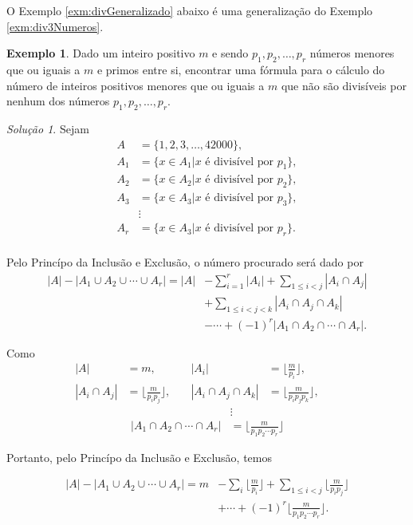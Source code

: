 \documentclass[]{book}
\theoremstyle{definition}
\theoremstyle{definition}
\newtheorem{example}{Exemplo}[chapter]
\theoremstyle{definition}
\theoremstyle{remark}
\newtheorem*{solution}{Solução}
\begin{document}
O Exemplo \ref{exm:divGeneralizado} abaixo é uma generalização do Exemplo \ref{exm:div3Numeros}.

\begin{example}
\protect\hypertarget{exm:divGeneralizado}{}{\label{exm:divGeneralizado} }Dado um inteiro positivo \(m\) e sendo \(p_1, p_2, \ldots, p_r\) números menores que ou iguais a \(m\) e primos entre si, encontrar uma fórmula para o cálculo do número de inteiros positivos menores que ou iguais a \(m\) que não são divisíveis por nenhum dos números \(p_1, p_2, \ldots, p_r\).
\end{example}

\begin{solution}
\iffalse{} {Solução. } \fi{}Sejam
\begin{align}
A &= \{1, 2, 3, \ldots, 42000\}, \\
A_1 &= \{x \in A_1 | x \text{ é divisível por } p_1\}, \\
A_2 &= \{x \in A_2 | x \text{ é divisível por } p_2\}, \\
A_3 &= \{x \in A_3 | x \text{ é divisível por } p_3\}, \\
    &\vdots\\
A_r &= \{x \in A_3 | x \text{ é divisível por } p_r\}. \\
\end{align}

Pelo Princípo da Inclusão e Exclusão, o número procurado será dado por
\begin{align} 
|A| - |A_1\cup A_2 \cup \cdots \cup A_r| = |A| &- \sum_{i=1}^{r}|A_i| + \sum_{1\leq i<j}|A_i \cap A_j|\\
 & + \sum_{1\leq i<j<k}|A_i \cap A_j \cap A_k|\\
 & - \cdots + (-1)^r|A_1 \cap A_2 \cap\cdots\cap A_r|.
\end{align}

Como
\begin{align} 
|A| &= m, &\quad |A_i| &= \bigg\lfloor{\frac{m}{p_i}}\bigg\rfloor, &\quad \\
|A_i \cap A_j| &= \bigg\lfloor{\frac{m}{p_i p_j}}\bigg\rfloor, &\quad 
|A_i \cap A_j \cap A_k| &= \bigg\lfloor{\frac{m}{p_i p_j p_k}}\bigg\rfloor,
\end{align}
\begin{align} 
&\vdots \\ |A_1 \cap A_2 \cap\cdots\cap A_r| &= \bigg\lfloor{\frac{m}{p_1 p_2 \cdots p_r}}\bigg\rfloor
\end{align}

Portanto, pelo Princípo da Inclusão e Exclusão, temos

\begin{align}
|A| - |A_1\cup A_2 \cup \cdots \cup A_r| = m &- \sum_{i}\bigg\lfloor{\frac{m}{p_i}}\bigg\rfloor + \sum_{1\leq i < j}\bigg\lfloor{\frac{m}{p_i p_j}}\bigg\rfloor \\
&+ \cdots + (-1)^r\bigg\lfloor{\frac{m}{p_1 p_2 \cdots p_r}}\bigg\rfloor.
\end{align}
\end{solution}
\end{document}
